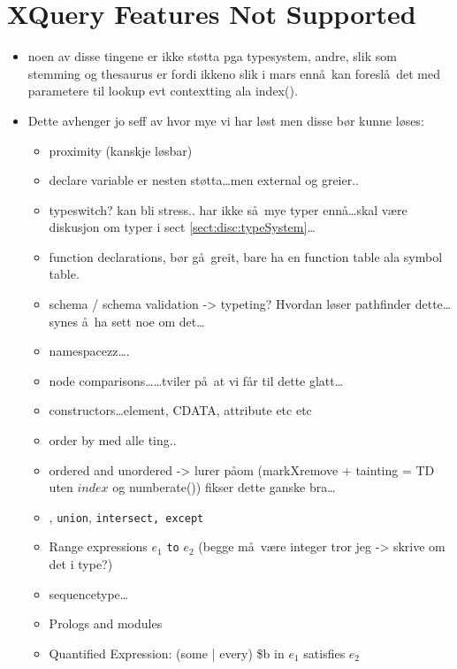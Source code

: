 \section{XQuery Features Not Supported}
\label{sect:discussion:notSupported}
\begin{itemize}
\item noen av disse tingene er ikke st\o tta pga typesystem, andre, slik som stemming og thesaurus er fordi ikkeno
slik i mars enn\aa~kan foresl\aa~det med parametere til lookup evt contextting ala \textsf{index()}.
  \item Dette avhenger jo seff av hvor mye vi har l\o st men disse b\o r kunne
  l\o ses:
  	\begin{itemize}
  		\item proximity (kanskje l\o sbar)
  		\item declare variable er nesten st\o tta\ldots men external og greier..
  		\item typeswitch? kan bli stress.. har ikke s\aa~mye typer enn\aa \ldots skal v\ae re diskusjon om typer i
  		sect \ref{sect:disc:typeSystem}\ldots
  		\item function declarations, b\o r g\aa~greit, bare ha en function table ala symbol table.
  		\item schema / schema validation -> typeting? Hvordan l\o ser pathfinder dette\ldots synes \aa~ha sett noe om
  		det\ldots
  		\item namespacezz\ldots.
  		\item node comparisons\ldots\ldots tviler p\aa~at vi f\aa r til dette glatt\ldots
  		\item constructors\ldots element, CDATA, attribute etc etc
  		\item order by med alle ting..
  		\item ordered and unordered -> lurer p\aa om (markXremove + tainting = TD uten $index$ og
  		\textsf{numberate()}) fikser dette ganske bra\ldots
  		\item \textbar, \texttt{union}, \texttt{intersect, except}
  		\item Range expressions $e_1$ \texttt{to} $e_2$ (begge m\aa~være integer tror jeg -> skrive om det i type?)
  		\item sequencetype\ldots
  		\item Prologs and modules
  		\item Quantified Expression: (some | every) \$b in $e_1$ satisfies $e_2$
  		\end{itemize}
	\end{itemize}
